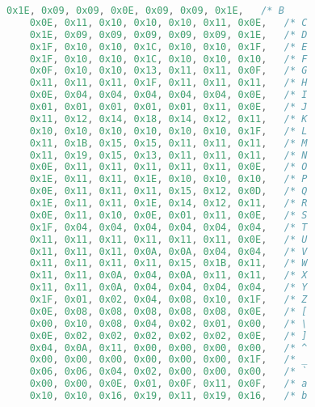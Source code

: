 \begin{lstlisting}[language=C]
    0x1E, 0x09, 0x09, 0x0E, 0x09, 0x09, 0x1E,   /* B                        */
    0x0E, 0x11, 0x10, 0x10, 0x10, 0x11, 0x0E,   /* C                        */
    0x1E, 0x09, 0x09, 0x09, 0x09, 0x09, 0x1E,   /* D                        */
    0x1F, 0x10, 0x10, 0x1C, 0x10, 0x10, 0x1F,   /* E                        */
    0x1F, 0x10, 0x10, 0x1C, 0x10, 0x10, 0x10,   /* F                        */
    0x0F, 0x10, 0x10, 0x13, 0x11, 0x11, 0x0F,   /* G                        */
    0x11, 0x11, 0x11, 0x1F, 0x11, 0x11, 0x11,   /* H                        */
    0x0E, 0x04, 0x04, 0x04, 0x04, 0x04, 0x0E,   /* I                        */
    0x01, 0x01, 0x01, 0x01, 0x01, 0x11, 0x0E,   /* J                        */
    0x11, 0x12, 0x14, 0x18, 0x14, 0x12, 0x11,   /* K                        */
    0x10, 0x10, 0x10, 0x10, 0x10, 0x10, 0x1F,   /* L                        */
    0x11, 0x1B, 0x15, 0x15, 0x11, 0x11, 0x11,   /* M                        */
    0x11, 0x19, 0x15, 0x13, 0x11, 0x11, 0x11,   /* N                        */
    0x0E, 0x11, 0x11, 0x11, 0x11, 0x11, 0x0E,   /* O                        */
    0x1E, 0x11, 0x11, 0x1E, 0x10, 0x10, 0x10,   /* P                        */
    0x0E, 0x11, 0x11, 0x11, 0x15, 0x12, 0x0D,   /* Q                        */
    0x1E, 0x11, 0x11, 0x1E, 0x14, 0x12, 0x11,   /* R                        */
    0x0E, 0x11, 0x10, 0x0E, 0x01, 0x11, 0x0E,   /* S                        */
    0x1F, 0x04, 0x04, 0x04, 0x04, 0x04, 0x04,   /* T                        */
    0x11, 0x11, 0x11, 0x11, 0x11, 0x11, 0x0E,   /* U                        */
    0x11, 0x11, 0x11, 0x0A, 0x0A, 0x04, 0x04,   /* V                        */
    0x11, 0x11, 0x11, 0x11, 0x15, 0x1B, 0x11,   /* W                        */
    0x11, 0x11, 0x0A, 0x04, 0x0A, 0x11, 0x11,   /* X                        */
    0x11, 0x11, 0x0A, 0x04, 0x04, 0x04, 0x04,   /* Y                        */
    0x1F, 0x01, 0x02, 0x04, 0x08, 0x10, 0x1F,   /* Z                        */
    0x0E, 0x08, 0x08, 0x08, 0x08, 0x08, 0x0E,   /* [                        */
    0x00, 0x10, 0x08, 0x04, 0x02, 0x01, 0x00,   /* \                        */
    0x0E, 0x02, 0x02, 0x02, 0x02, 0x02, 0x0E,   /* ]                        */
    0x04, 0x0A, 0x11, 0x00, 0x00, 0x00, 0x00,   /* ^                        */
    0x00, 0x00, 0x00, 0x00, 0x00, 0x00, 0x1F,   /* _                        */
    0x06, 0x06, 0x04, 0x02, 0x00, 0x00, 0x00,   /* `                        */
    0x00, 0x00, 0x0E, 0x01, 0x0F, 0x11, 0x0F,   /* a                        */
    0x10, 0x10, 0x16, 0x19, 0x11, 0x19, 0x16,   /* b                        */

\end{lstlisting}
